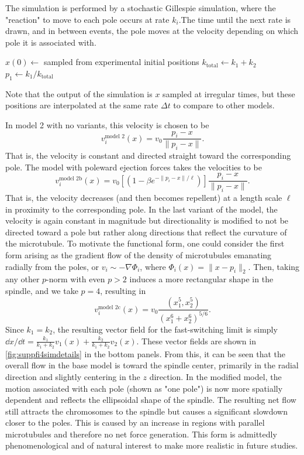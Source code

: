 \documentclass[times, twoside,onecolumn]{zHenriquesLab-StyleBioRxiv}
\begin{document}
The simulation is performed by a stochastic Gillespie simulation, where the "reaction" to move to each pole occurs at rate $k_i$.The time until the next rate is drawn, and in between events, the pole moves at the velocity depending on which pole it is associated with. 

\begin{pseudocode}[H]
     \caption{Model 2 simulation algorithm.}
     $x(0) \gets$ sampled from experimental initial positions\;
    $k_\mathrm{total}\gets k_1+k_2$\;
    $p_1 \gets k_1/k_\mathrm{total}$\;
\end{pseudocode}

Note that the output of the simulation is $x$ sampled at irregular times, but these positions are interpolated at the same rate $\Delta t$ to compare to other models.

In model 2 with no variants, this velocity is chosen to be 
$$
v_i^{\text{model 2}}(x) = v_0 \frac{p_i-x}{\|p_i-x\|}.
$$
That is, the velocity is constant and directed straight toward the corresponding pole. The model with poleward ejection forces takes the velocities to be 
$$
v_i^{\text{model 2b}}(x) = v_0 \left[ \left (1-\beta e^{-\|p_i-x\|/\ell}\right)\right] \frac{p_i-x}{\|p_i-x\|}.
$$
That is, the velocity decreases (and then becomes repellent) at a length scale $\ell$ in proximity to the corresponding pole. In the last variant of the model, the velocity is again constant in magnitude but directionality is modified to not be directed toward a pole but rather along directions that reflect the curvature of the microtubule. To motivate the functional form, one could consider the first form arising as the gradient flow of the density of microtubules emanating radially from the poles, or $v_i \sim -\nabla \Phi_i$, where $\Phi_i(x) = \|x-p_i\|_2$. Then, taking any other $p$-norm with even $p>2$ induces a more rectangular shape in the spindle, and we take $p=4$, resulting in 
$$
v_i^{\text{model 2c}}(x) = v_0 \frac{(x_1^5, x_2^5)}{(x_1^6+x_2^6)^{5/6}}.
$$
Since $k_1=k_2$, the resulting vector field for the fast-switching limit is simply $\dd x/ \dd t = \frac{k_1}{k_1+k_2}v_1(x)+\frac{k_2}{k_1+k_2}v_2(x)$. These vector fields are shown in \cref{fig:suppfi4simdetails} in the bottom panels. From this, it can be seen that the overall flow in the base model  is toward the spindle center, primarily in the radial direction and slightly centering in the $z$ direction. In the modified model, the motion associated with each pole (shown as "one pole") is now more spatially dependent and reflects the ellipsoidal shape of the spindle. The resulting net flow still attracts the chromosomes to the spindle but causes a significant slowdown closer to the poles. This is caused by an increase in regions with parallel microtubules and therefore no net force generation. This form is admittedly phenomenological and of natural interest to make more realistic in future studies. 
\end{document}

